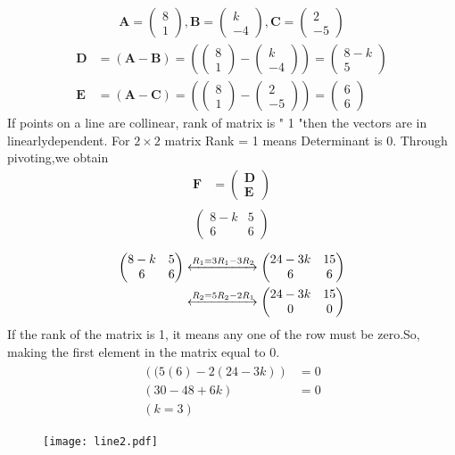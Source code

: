 \documentclass[journal,10pt,twocolumn]{article}
\newcommand{\myvec}[1]{\ensuremath{\begin{pmatrix}#1\end{pmatrix}}}
\let\vec\mathbf
\providecommand{\brak}[1]{\ensuremath{\left(#1\right)}}
\let\vec\mathbf
\begin{document}
\begin{enumerate}
\begin{align}  
\vec{A}=\myvec{8 \\ 1},
\vec{B}=\myvec{k \\ -4},
\vec{C}=\myvec{2 \\ -5}
\end{align}
\begin{align}  
 \vec{D} &=\brak{\vec{A}-\vec{B}} = \brak{\myvec{8 \\1 } - \myvec{k \\-4 } } = \myvec{8-k \\ 5 }\\
\vec{E} &= \brak{\vec{A}-\vec{C}} = \brak{\myvec{8 \\ 1 } - \myvec{2 \\-5 } } = \myvec{6 \\6}
\end{align}
If points on a line  are  collinear, rank of matrix is " 1 "then the vectors are in linearlydependent.
For $2\times2$ matrix Rank = 1 means Determinant is 0.
Through pivoting,we obtain
\begin{align}
\vec{F} &={\myvec{\vec{D}\\ \vec{E}}}
\end{align}
\begin{align}
\begin{split}
\myvec{
8-k & 5
 \\
6 & 6
}
\end{split}
\end{align}
\begin{align}
\label{eq:chem_balance_mat_row}
\myvec{
8-k & 5
\\
6 & 6
}
 \xleftrightarrow[]{R_1 = 3R_1-3R_2}
\myvec{
24-3k & 15
\\
6 & 6
}
\\
\xleftrightarrow[]{R_2 = 5R_2-2R_1}
\myvec{
24-3k & 15
\\
0 & 0
}
\end{align}
If the rank of the matrix is 1, it means any one of the row must be zero.So, making the first element in the matrix equal to 0.
\begin{align}
\begin{split}
\brak{(5(6)-2(24-3k)}&=0
\\
\brak{30-48+6k}&=0
\\
\brak{k=3} 
\end{split}
\end{align}

\begin{figure}[h]
	  \centering 
	  \texttt{[image: line2.pdf]}
	  \caption{}
	  \label{fig:line2.png}
	  \end{figure}
\end{enumerate} 
\end{document}
